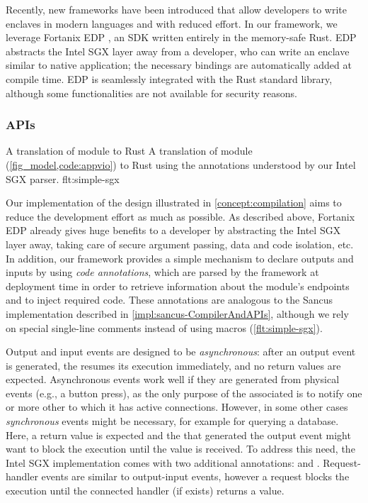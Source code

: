 Recently, new frameworks have been introduced that allow developers to write
enclaves in modern languages and with reduced effort. In our framework, we
leverage Fortanix \ac{EDP} \cite{fortanix-edp}, an SDK written entirely in the
memory-safe Rust. \ac{EDP} abstracts the Intel \ac{SGX} layer away
from a developer, who can write an enclave similar to native application; the
necessary bindings are automatically added at compile time.
\ac{EDP} is seamlessly integrated with the Rust standard library, although some
functionalities are not available for security reasons.

\subsubsection{APIs}

%
  {}{A translation of module  to Rust}%
  {A translation of module  (\cref{fig_model,code:appvio}) to Rust
using the annotations understood by our Intel \ac{SGX} parser.}%
  {flt:simple-sgx}

Our implementation of the design illustrated in \cref{concept:compilation} aims
to reduce the development effort as much as possible. As described above,
Fortanix \ac{EDP} already gives huge benefits to a developer by abstracting the
Intel \ac{SGX} layer away, taking care of secure argument passing,
data and code isolation, etc. In addition, our framework provides a
simple mechanism to declare outputs and inputs by using \emph{code annotations},
which are parsed by the framework at deployment time in order to retrieve
information about the module's endpoints and to inject required code. These
annotations are analogous to the Sancus implementation described in
\cref{impl:sancus-CompilerAndAPIs}, although we rely on special single-line
comments instead of using macros (\cref{flt:simple-sgx}).

Output and input events are designed to be \emph{asynchronous}: after an output
event is generated, the \protmod{} resumes its execution immediately, and no
return values are expected. Asynchronous events work well if they are generated
from physical events (e.g., a button press), as the only purpose of the
associated \protmod{} is to notify one or more other \protmods{} to which it has
active connections. However, in some other cases \emph{synchronous} events might
be necessary, for example for querying a database. Here, a return value is
expected and the \protmod{} that generated the output event might want to block
the execution until the value is received. To address this need, the Intel
\ac{SGX} implementation comes with two additional annotations:  and . Request-handler events are similar to
output-input events, however a request blocks the execution until the connected
handler (if exists) returns a value.

